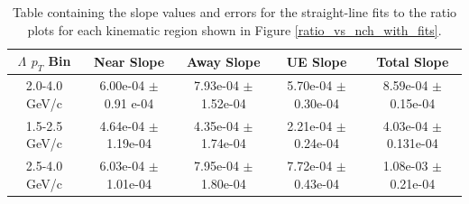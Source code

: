\documentclass[ALICE,manyauthors]{ALICE_analysis_notes}
\begin{document}
\begin{table}[h!]
\centering
\begin{tabular}{| c | c | c | c | c | }
\hline
$\Lambda$ $p_{T}$ Bin & Near Slope & Away Slope & UE Slope & Total Slope \\
\hline
2.0-4.0 GeV/c & 6.00e-04 $\pm$ 0.91 e-04  & 7.93e-04 $\pm$ 1.52e-04 &  5.70e-04 $\pm$ 0.30e-04 & 8.59e-04 $\pm$ 0.15e-04 \\
1.5-2.5 GeV/c & 4.64e-04 $\pm$ 1.19e-04 & 4.35e-04 $\pm$ 1.74e-04 & 2.21e-04 $\pm$ 0.24e-04 & 4.03e-04 $\pm$ 0.131e-04 \\
2.5-4.0 GeV/c & 6.03e-04 $\pm$ 1.01e-04 & 7.95e-04 $\pm$ 1.80e-04 & 7.72e-04 $\pm$ 0.43e-04 & 1.08e-03 $\pm$ 0.21e-04 \\
\hline
\end{tabular}
\caption{Table containing the slope values and errors for the straight-line fits to the ratio plots for each kinematic region shown in Figure \ref{ratio_vs_nch_with_fits}.}
\label{ratio_vs_nch_fit_table}
\end{table}

\clearpage
\end{document}
